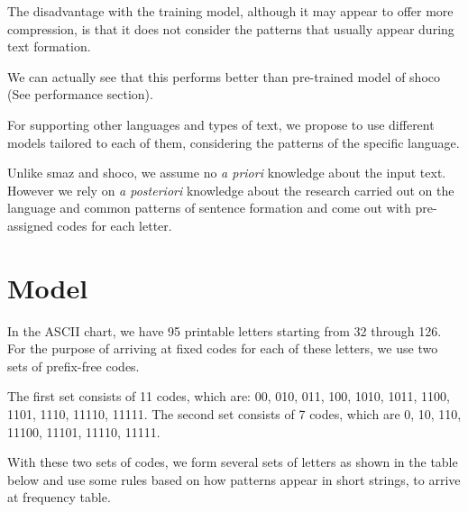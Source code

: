 \documentclass[]{article}
\begin{document}
The disadvantage with the training model, although it may appear to offer more compression, is that it does not consider the patterns that usually appear during text formation.

We can actually see that this performs better than pre-trained model of shoco (See performance section).

For supporting other languages and types of text, we propose to use different models tailored to each of them, considering the patterns of the specific language.

Unlike smaz and shoco, we assume no \emph{a priori} knowledge about the input text.  However we rely on \emph{a posteriori} knowledge about the research carried out on the language and common patterns of sentence formation and come out with pre-assigned codes for each letter.

\section{Model}

In the ASCII chart, we have 95 printable letters starting from 32 through 126.  For the purpose of arriving at fixed codes for each of these letters, we use two sets of prefix-free codes.

The first set consists of 11 codes, which are: 00, 010, 011, 100, 1010, 1011, 1100, 1101, 1110, 11110, 11111.  The second set consists of 7 codes, which are 0, 10, 110, 11100, 11101, 11110, 11111.

With these two sets of codes, we form several sets of letters as shown in the table below and use some rules based on how patterns appear in short strings, to arrive at frequency table.
\end{document}
